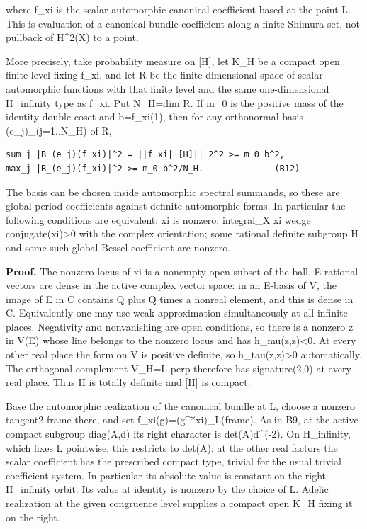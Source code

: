 where f\_xi is the scalar automorphic canonical coefficient based at the point L. This is evaluation of a canonical-bundle coefficient along a finite Shimura set, not pullback of H\^{}2(X) to a point.

More precisely, take probability measure on {[}H{]}, let K\_H be a compact open finite level fixing f\_xi, and let R be the finite-dimensional space of scalar automorphic functions with that finite level and the same one-dimensional H\_infinity type as f\_xi. Put N\_H=dim R. If m\_0 is the positive mass of the identity double coset and b=\textbar f\_xi(1)\textbar, then for any orthonormal basis (e\_j)\_(j=1..N\_H) of R,

\begin{verbatim}
sum_j |B_(e_j)(f_xi)|^2 = ||f_xi|_[H]||_2^2 >= m_0 b^2,
max_j |B_(e_j)(f_xi)|^2 >= m_0 b^2/N_H.              (B12)
\end{verbatim}

The basis can be chosen inside automorphic spectral summands, so these are global period coefficients against definite automorphic forms. In particular the following conditions are equivalent: xi is nonzero; integral\_X xi wedge conjugate(xi)\textgreater0 with the complex orientation; some rational definite subgroup H and some such global Bessel coefficient are nonzero.

\textbf{Proof.} The nonzero locus of xi is a nonempty open subset of the ball. E-rational vectors are dense in the active complex vector space: in an E-basis of V, the image of E in C contains Q plus Q times a nonreal element, and this is dense in C. Equivalently one may use weak approximation simultaneously at all infinite places. Negativity and nonvanishing are open conditions, so there is a nonzero z in V(E) whose line belongs to the nonzero locus and has h\_mu(z,z)\textless0. At every other real place the form on V is positive definite, so h\_tau(z,z)\textgreater0 automatically. The orthogonal complement V\_H=L-perp therefore has signature(2,0) at every real place. Thus H is totally definite and {[}H{]} is compact.

Base the automorphic realization of the canonical bundle at L, choose a nonzero tangent2-frame there, and set f\_xi(g)=(g\^{}*xi)\_L(frame). As in B9, at the active compact subgroup diag(A,d) its right character is det(A)d\^{}(-2). On H\_infinity, which fixes L pointwise, this restricts to det(A); at the other real factors the scalar coefficient has the prescribed compact type, trivial for the usual trivial coefficient system. In particular its absolute value is constant on the right H\_infinity orbit. Its value at identity is nonzero by the choice of L. Adelic realization at the given congruence level supplies a compact open K\_H fixing it on the right.

